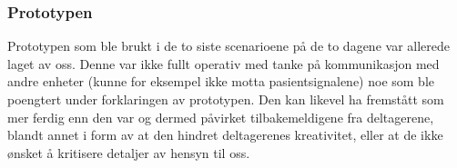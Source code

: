 \subsubsection{Prototypen}
Prototypen som ble brukt i de to siste scenarioene på de to dagene var allerede laget av oss. Denne var ikke fullt operativ med tanke på kommunikasjon med andre enheter (kunne for eksempel ikke motta pasientsignalene) noe som ble poengtert under forklaringen av prototypen. Den kan likevel ha fremstått som mer ferdig enn den var og dermed påvirket tilbakemeldigene fra deltagerene, blandt annet i form av at den hindret deltagerenes kreativitet, eller at de ikke ønsket å kritisere detaljer av hensyn til oss.

 